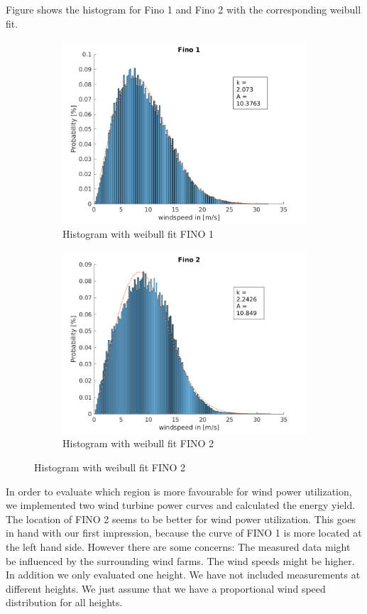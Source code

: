 \documentclass[10pt]{article}
\begin{document}
Figure shows the histogram for Fino 1 and Fino 2 with the corresponding weibull fit.
\begin{figure}[htb!]

\begin{subfigure}{0.5\textwidth}
  \centering
  \includegraphics[width=0.8\linewidth]{../figures/Hist_withfit_Fino1.png}
  \caption{Histogram with weibull fit FINO 1}
  \label{fig:Windrose_Fino1}
\end{subfigure}
\begin{subfigure}{0.5\textwidth}
  \centering
  \includegraphics[width=1\linewidth]{../figures/Hist_withfit_Fino2.png}
  \caption{Histogram with weibull fit FINO 2}
    \label{fig:Windrose_Fino2}
\end{subfigure}
\label{fig:WindRose1_valdidation}
\end{figure}
In order to evaluate which region is more favourable for wind power utilization, we implemented two wind turbine power curves and calculated the energy yield.
The location of FINO 2 seems to be better for wind power utilization. This goes in hand with our first impression, because the curve of FINO 1 is more located at the left hand side. However there are some concerns: The measured data might be influenced by the surrounding wind farms. The wind speeds might be higher. In addition we only evaluated one height. We have not included measurements at different heights. We just assume that we have a proportional wind speed distribution for all heights.  
\newpage
\end{document}
